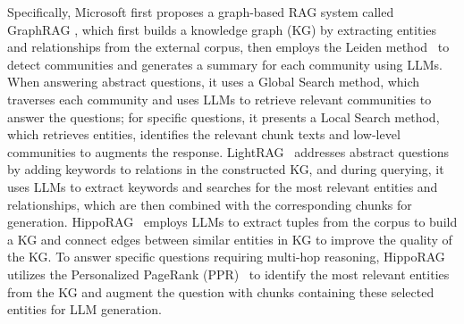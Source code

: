 Specifically, Microsoft first proposes a graph-based RAG system called GraphRAG \cite{edge2024local}, which first builds a knowledge graph (KG) by extracting entities and relationships from the external corpus, then employs the Leiden method~\cite{traag2019louvain} to detect communities and generates a summary for each community using LLMs.
%
When answering abstract questions, it uses a Global Search method, which traverses each community and uses LLMs to retrieve relevant communities to answer the questions; for specific questions, it presents a Local Search method, which retrieves entities, identifies the relevant chunk texts and low-level communities to augments the response.
% 
LightRAG~\cite{guo2024lightrag} addresses abstract questions by adding keywords to relations in the constructed KG, and during querying, it uses LLMs to extract keywords and searches for the most relevant entities and relationships, which are then combined with the corresponding chunks for generation.
%
HippoRAG~\cite{gutierrez2024hipporag} employs LLMs to extract tuples from the corpus to build a KG and connect edges between similar entities in KG to improve the quality of the KG.
%
To answer specific questions requiring multi-hop reasoning, HippoRAG utilizes the Personalized PageRank (PPR)~\cite{haveliwala2002topic} to identify the most relevant entities from the KG and augment the question with chunks containing these selected entities for LLM generation.


%



